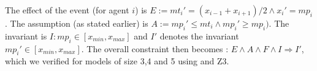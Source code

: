 
The effect of the event (for agent $i$) is $E := mt_i' = (x_{i-1} + x_{i+1})/2  \wedge x_i' = mp_i$.  The assumption (as stated earlier) is $A := mp_i' \leq mt_i \wedge mp_i' \geq mp_i)$.  The invariant is $I: \mathit{mp}_i \in [x_{min}, x_{max}]$ and $I'$ denotes the invariant $\mathit{mp}_i' \in [x_{min}, x_{max}]$.  The overall constraint then becomes :
                   $E \wedge A \wedge F \wedge I \Rightarrow I'$, which we verified for models of size 3,4 and 5 using \K and Z3.



